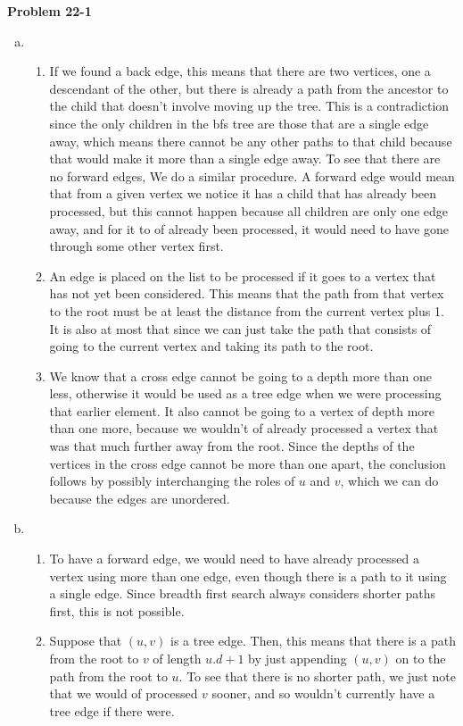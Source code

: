 \documentclass{article}
\begin{document}
\noindent\textbf{Problem 22-1}\\

\begin{enumerate}[a)]
\item
\begin{enumerate}[1.]
\item
If we found a back edge, this means that there are two vertices, one a descendant of the other, but there is already a path from the ancestor to the child that doesn't involve moving up the tree. This is a contradiction since the only children in the bfs tree are those that are a single edge away, which means there cannot be any other paths to that child because that would make it more than a single edge away. To see that there are no forward edges, We do a similar procedure. A forward edge would mean that from a given vertex we notice it has a child that has already been processed, but this cannot happen because all children are only one edge away, and for it to of already been processed, it would need to have gone through some other vertex first.
\item
An edge is placed on the list to be processed if it goes to a vertex that has not yet been considered. This means that the path from that vertex to the root must be at least the distance from the current vertex plus 1. It is also at most that since we can just take the path that consists of going to the current vertex and taking its path to the root.
\item
We know that a cross edge cannot be going to a depth more than one less, otherwise it would be used as a tree edge when we were processing that earlier element. It also cannot be going to a vertex of depth more than one more, because we wouldn't of already processed a vertex that was that much further away from the root. Since the depths of the vertices in the cross edge cannot be more than one apart, the conclusion follows by possibly interchanging the roles of $u$ and $v$, which we can do because the edges are unordered.
\end{enumerate}
\item
\begin{enumerate}[1.]
\item
To have a forward edge, we would need to have already processed a vertex using more than one edge, even though there is a path to it using a single edge. Since breadth first search always considers shorter paths first, this is not possible.
\item
Suppose that $(u,v)$ is a tree edge. Then, this means that there is a path from the root to $v$ of length $u.d+1$ by just appending $(u,v)$ on to the path from the root to $u$. To see that there is no shorter path, we just note that we would of processed $v$ sooner, and so wouldn't currently have a tree edge if there were.

\end{enumerate}
\end{enumerate}
\end{document}
